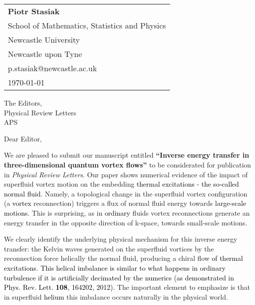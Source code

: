 \documentclass[a4paper,10pt]{letter}
\def\red#1{\textcolor{black}{#1}}
\begin{document}
\begin{flushright}
    \begin{tabular}{l}
        \textbf{Piotr Stasiak} \\
        School of Mathematics, Statistics and Physics\\
        Newcastle University \\
        Newcastle  upon Tyne \\
        p.stasiak@newcastle.ac.uk \\
        \today
    \end{tabular}
\end{flushright}

\vspace{1cm}

The Editors,\\
Physical Review Letters\\
APS\\


\vspace{1cm}

Dear Editor,

\vspace{0.5cm}

We are pleased to submit our manuscript entitled 
\textbf{``Inverse energy transfer in three-dimensional quantum vortex flows''}
 to be considerated for publication in \textit{Physical Review Letters}. 
Our paper shows numerical evidence of the impact of superfluid vortex motion 
on the embedding \red{thermal excitations - the so-called normal
fluid}. Namely, a topological change in the superfluid vortex configuration 
(a \red{vortex} reconnection) triggers
a flux of normal fluid energy towards \red{large-scale motions}. 
This is surprising, as in \red{ordinary} fluids vortex 
reconnections generate an energy transfer in the opposite direction of
k-space, towards small-scale motions.

We clearly identify the underlying physical mechanism for this inverse 
energy transfer: the Kelvin waves 
generated on the superfluid vortices by the reconnection force 
helically the normal fluid, producing a
chiral flow \red{of thermal excitations}.  
\red{This helical imbalance is similar to what happens in 
\red{ordinary}
turbulence if it is artificially decimated by the numerics (as
demonstrated in Phys. Rev. Lett.
{\bf 108}, 164202, 2012).}
The important element to emphasize is that 
in superfluid \red{helium} this imbalance occurs naturally in the physical
world.
\end{document}
